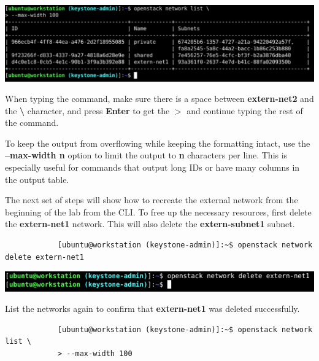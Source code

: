 \documentclass[letterpaper, 12pt]{article}
\begin{document}
\begin{enumerate}
\begin{labstep}
        \begin{center}
            \includegraphics[width=\linewidth]{images/part1/step12.png}
        \end{center}
    \end{labstep}

    \begin{tipbox}
        When typing the command, make sure there is a space between \textbf{extern-net2} and the \textbf{\textbackslash} character, and press \textbf{Enter} to get the \textbf{$>$} and continue typing the rest of the command.
    \end{tipbox}

    \begin{tipbox}
        To keep the output from overflowing while keeping the formatting intact, use the \textbf{--max-width n} option to limit the output to \textbf{n} characters per line.
        This is especially useful for commands that output long IDs or have many columns in the output table.
    \end{tipbox}

    \begin{labstep}
        The next set of steps will show how to recreate the external network from the beginning of the lab from the CLI.
        To free up the necessary resources, first delete the \textbf{extern-net1} network.
        This will also delete the \textbf{extern-subnet1} subnet.
        \begin{lstlisting}
            [ubuntu@workstation (keystone-admin)]:~$ openstack network delete extern-net1
        \end{lstlisting}

        \begin{center}
            \includegraphics[width=\linewidth]{images/part1/step13.png}
        \end{center}
    \end{labstep}

    \begin{labstep}
        List the networks again to confirm that \textbf{extern-net1} was deleted successfully.
        \begin{lstlisting}
            [ubuntu@workstation (keystone-admin)]:~$ openstack network list \
            > --max-width 100
        \end{lstlisting}


\end{labstep}
\end{enumerate}
\end{document}
